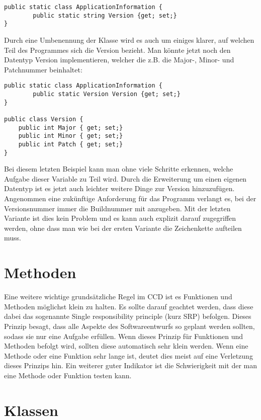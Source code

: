 \lstset{style=sharpc}
\begin{lstlisting}
public static class ApplicationInformation {
		public static string Version {get; set;}
}
\end{lstlisting}

Durch eine Umbenennung der Klasse wird es auch um einiges klarer, auf welchen Teil des Programmes sich die Version bezieht. Man könnte jetzt noch den Datentyp Version implementieren, welcher die z.B. die Major-, Minor- und Patchnummer beinhaltet:

\lstset{style=sharpc}
\begin{lstlisting}
public static class ApplicationInformation {
		public static Version Version {get; set;}
}

public class Version {
	public int Major { get; set;}
	public int Minor { get; set;}
	public int Patch { get; set;}
}
\end{lstlisting}

Bei diesem letzten Beispiel kann man ohne viele Schritte erkennen, welche Aufgabe dieser Variable zu Teil wird. Durch die Erweiterung um einen eigenen Datentyp ist es jetzt auch leichter weitere Dinge zur Version hinzuzufügen. Angenommen eine zukünftige Anforderung für das Programm verlangt es, bei der Versionsnummer immer die Buildnummer mit anzugeben. Mit der letzten Variante ist dies kein Problem und es kann auch explizit darauf zugegriffen werden, ohne dass man wie bei der ersten Variante die Zeichenkette aufteilen muss.

\section{Methoden}
Eine weitere wichtige grundsätzliche Regel im CCD ist es Funktionen und Methoden möglichst klein zu halten. Es sollte darauf geachtet werden, dass diese dabei das sogenannte Single responsibility principle (kurz SRP) befolgen. Dieses Prinzip besagt, dass alle Aspekte des Softwareentwurfs so geplant werden sollten, sodass sie nur eine Aufgabe erfüllen. Wenn dieses Prinzip für Funktionen und Methoden befolgt wird, sollten diese automatisch sehr klein werden. Wenn eine Methode oder eine Funktion sehr lange ist, deutet dies meist auf eine Verletzung dieses Prinzips hin. Ein weiterer guter Indikator ist die Schwierigkeit mit der man eine Methode oder Funktion testen kann. 

\section{Klassen}